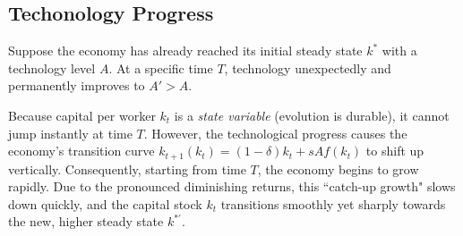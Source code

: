 \subsection{Techonology Progress}

Suppose the economy has already reached its initial steady state $k^*$ with a technology level $A$. At a specific time $T$, technology unexpectedly and permanently improves to $A' > A$. 

Because capital per worker $k_t$ is a \textit{state variable} (evolution is durable), it cannot jump instantly at time $T$. However, the technological progress causes the economy's transition curve $k_{t+1}(k_t) = (1-\delta)k_t + sAf(k_t)$ to shift up vertically. Consequently, starting from time $T$, the economy begins to grow rapidly. Due to the pronounced diminishing returns, this ``catch-up growth" slows down quickly, and the capital stock $k_t$ transitions smoothly yet sharply towards the new, higher steady state $k^{*\prime}$.

